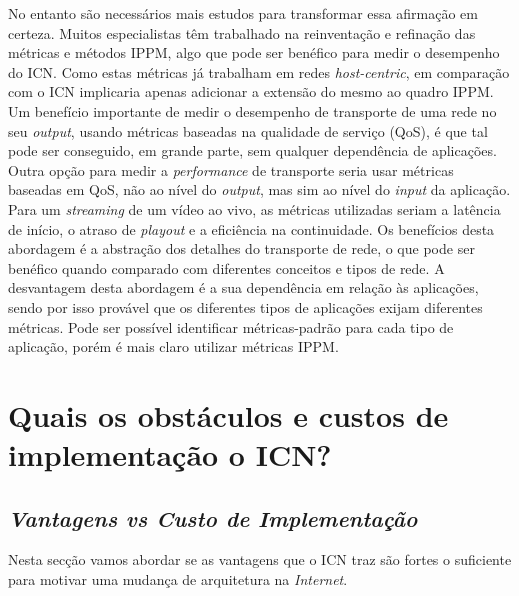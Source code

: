\documentclass[conference]{IEEEtran}
\begin{document}
No entanto s\~{a}o necess\'{a}rios mais estudos para transformar essa afirma\c{c}\~{a}o em certeza. Muitos especialistas t\^{e}m trabalhado na reinventa\c{c}\~{a}o e refina\c{c}\~{a}o das m\'{e}tricas e m\'{e}todos IPPM, algo que pode ser ben\'{e}fico para medir o desempenho do ICN. Como estas m\'{e}tricas j\'{a} trabalham em redes \textit{host-centric}, em compara\c{c}\~{a}o com o ICN implicaria apenas adicionar a extens\~{a}o do mesmo ao quadro IPPM. Um benef\'{i}cio importante de medir o desempenho de transporte de uma rede no seu \textit{output}, usando m\'{e}tricas baseadas na qualidade de servi\c{c}o (QoS), \'{e} que tal pode ser conseguido, em grande parte, sem qualquer depend\^{e}ncia de aplica\c{c}\~{o}es. Outra op\c{c}\~{a}o para medir a \textit{performance} de transporte seria usar m\'{e}tricas baseadas em QoS, n\~{a}o ao n\'{i}vel do \textit{output}, mas sim ao n\'{i}vel do \textit{input} da aplica\c{c}\~{a}o.\\

Para um \textit{streaming} de um v\'{i}deo ao vivo, as m\'{e}tricas utilizadas seriam a lat\^{e}ncia de in\'{i}cio, o atraso de \textit{playout} e a efici\^{e}ncia na continuidade. Os benef\'{i}cios desta abordagem \'{e} a abstra\c{c}\~{a}o dos detalhes do transporte de rede, o que pode ser ben\'{e}fico quando comparado com diferentes conceitos e tipos de rede. A desvantagem desta abordagem \'{e} a sua depend\^{e}ncia em rela\c{c}\~{a}o \`{a}s aplica\c{c}\~{o}es, sendo por isso prov\'{a}vel que os diferentes tipos de aplica\c{c}\~{o}es exijam diferentes m\'{e}tricas. Pode ser poss\'{i}vel identificar m\'{e}tricas-padr\~{a}o para cada tipo de aplica\c{c}\~{a}o, por\'{e}m \'{e} mais claro utilizar m\'{e}tricas IPPM.\\

\section{Quais os obst\'{a}culos e custos de implementa\c{c}\~{a}o o ICN?}



\subsection{\textit{Vantagens vs Custo de Implementa\c{c}\~{a}o}}

Nesta sec\c{c}\~{a}o vamos abordar se as vantagens que o ICN traz s\~{a}o fortes o suficiente para motivar uma mudan\c{c}a de arquitetura na \textit{Internet}.\\
\end{document}
